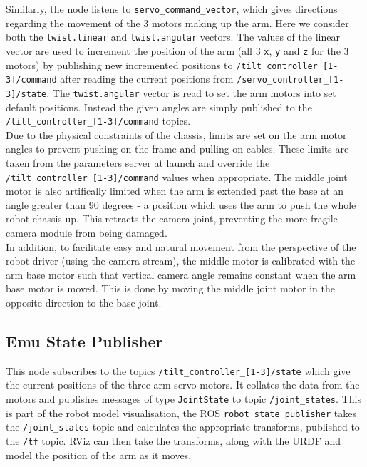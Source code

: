 \documentclass[titlepage,12pt,a4paper]{article}
\begin{document}
\noindent Similarly, the node listens to \texttt{servo\_command\_vector}, which gives directions regarding the movement of the 3 motors making up the arm. Here we consider both the \texttt{twist.linear} and \texttt{twist.angular} vectors. The values of the linear vector are used to increment the position of the arm (all 3 \texttt{x}, \texttt{y} and \texttt{z} for the 3 motors) by publishing new incremented positions to \texttt{/tilt\_controller\_[1-3]/command} after reading the current positions from \texttt{/servo\_controller\_[1-3]/state}. The \texttt{twist.angular} vector is read to set the arm motors into set default positions. Instead the given angles are simply published to the \texttt{/tilt\_controller\_[1-3]/command} topics. \\

\noindent Due to the physical constraints of the chassis, limits are set on the arm motor angles to prevent pushing on the frame and pulling on cables. These limits are taken from the parameters server at launch and override the \texttt{/tilt\_controller\_[1-3]/command} values when appropriate. The middle joint motor is also artifically limited when the arm is extended past the base at an angle greater than 90 degrees - a position which uses the arm to push the whole robot chassis up. This retracts the camera joint, preventing the more fragile camera module from being damaged.\\

\noindent In addition, to facilitate easy and natural movement from the perspective of the robot driver (using the camera stream), the middle motor is calibrated with the arm base motor such that vertical camera angle remains constant when the arm base motor is moved. This is done by moving the middle joint motor in the opposite direction to the base joint.\\

\subsection{Emu State Publisher}
This node subscribes to the topics \texttt{/tilt\_controller\_[1-3]/state} which give the current positions of the three arm servo motors. It collates the data from the motors and publishes messages of type \texttt{JointState} to topic \texttt{/joint\_states}. This is part of the robot model visualisation, the ROS \texttt{robot\_state\_publisher} takes the \texttt{/joint\_states} topic and calculates the appropriate transforms, published to the \texttt{/tf} topic. RViz can then take the transforms, along with the URDF and model the position of the arm as it moves. \\
\end{document}
